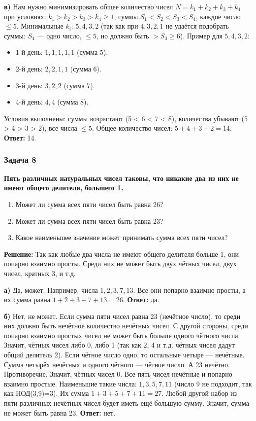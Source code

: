 \documentclass[12pt, a4paper]{article}
\begin{document}
\textbf{в)} Нам нужно минимизировать общее количество чисел \(N = k_1 + k_2 + k_3 + k_4\) при условиях:
\(k_1 > k_2 > k_3 > k_4 \ge 1\), суммы \(S_1 < S_2 < S_3 < S_4\), каждое число \(\le 5\).
Минимальные \(k_i\): \(5, 4, 3, 2\) (так как при \(4,3,2,1\) не удаётся подобрать суммы: \(S_4\) — одно число, \(\le 5\), но должно быть \(> S_3 \ge 6\)).
Пример для \(5, 4, 3, 2\):
\begin{itemize}
    \item 1-й день: \(1, 1, 1, 1, 1\) (сумма 5).
    \item 2-й день: \(2, 2, 1, 1\) (сумма 6).
    \item 3-й день: \(3, 2, 2\) (сумма 7).
    \item 4-й день: \(4, 4\) (сумма 8).
\end{itemize}
Условия выполнены: суммы возрастают (5 < 6 < 7 < 8), количества убывают (5 > 4 > 3 > 2), все числа \(\le 5\).
Общее количество чисел: \(5 + 4 + 3 + 2 = 14\).
\textbf{Ответ:} 14.

\subsubsection*{Задача 8}
\textbf{Пять различных натуральных чисел таковы, что никакие два из них не имеют общего делителя, большего 1.}
\begin{enumerate}[label=\alph*)]
    \item Может ли сумма всех пяти чисел быть равна 26?
    \item Может ли сумма всех пяти чисел быть равна 23?
    \item Какое наименьшее значение может принимать сумма всех пяти чисел?
\end{enumerate}

\textbf{Решение:}
Так как любые два числа не имеют общего делителя больше 1, они попарно взаимно просты. Среди них не может быть двух чётных чисел, двух чисел, кратных 3, и т.д.

\textbf{а)} Да, может. Например, числа $1, 2, 3, 7, 13$. Все они попарно взаимно просты, а их сумма равна $1+2+3+7+13 = 26$.
\textbf{Ответ:} да.

\textbf{б)} Нет, не может. 
Если сумма пяти чисел равна 23 (нечётное число), то среди них должно быть нечётное количество нечётных чисел. 
С другой стороны, среди попарно взаимно простых чисел не может быть больше одного чётного числа. Значит, чётных чисел либо 0, либо 1 (так как 2, 4 и т.д. чётных чисел дадут общий делитель 2).
Если чётное число одно, то остальные четыре — нечётные. Сумма четырёх нечётных и одного чётного — чётное число. А 23 нечётно. Противоречие.
Значит, чётных чисел 0. Все пять чисел нечётные и попарно взаимно простые.
Наименьшие такие числа: $1, 3, 5, 7, 11$ (число 9 не подходит, так как НОД(3,9)=3). Их сумма $1+3+5+7+11 = 27$.
Любой другой набор из пяти различных нечётных чисел будет иметь ещё большую сумму. Значит, сумма не может быть равна 23.
\textbf{Ответ:} нет.
\end{document}

